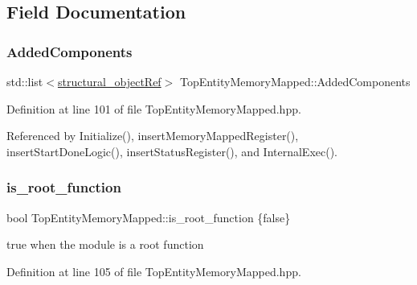 \subsection{Field Documentation}
\mbox{\label{classTopEntityMemoryMapped_ad5da69311efe3e70b80af56068179c0d}} 
\subsubsection{\texorpdfstring{Added\+Components}{AddedComponents}}
{\footnotesize\ttfamily std\+::list$<$\hyperlink{structural__objects_8hpp_a8ea5f8cc50ab8f4c31e2751074ff60b2}{structural\+\_\+object\+Ref}$>$ Top\+Entity\+Memory\+Mapped\+::\+Added\+Components\hspace{0.3cm}{\ttfamily [private]}}



Definition at line 101 of file Top\+Entity\+Memory\+Mapped.\+hpp.



Referenced by Initialize(), insert\+Memory\+Mapped\+Register(), insert\+Start\+Done\+Logic(), insert\+Status\+Register(), and Internal\+Exec().

\mbox{\label{classTopEntityMemoryMapped_a584c8bf5240e1347466bd161368b7312}} 
\subsubsection{\texorpdfstring{is\+\_\+root\+\_\+function}{is\_root\_function}}
{\footnotesize\ttfamily bool Top\+Entity\+Memory\+Mapped\+::is\+\_\+root\+\_\+function \{false\}\hspace{0.3cm}{\ttfamily [private]}}



true when the module is a root function 



Definition at line 105 of file Top\+Entity\+Memory\+Mapped.\+hpp.



